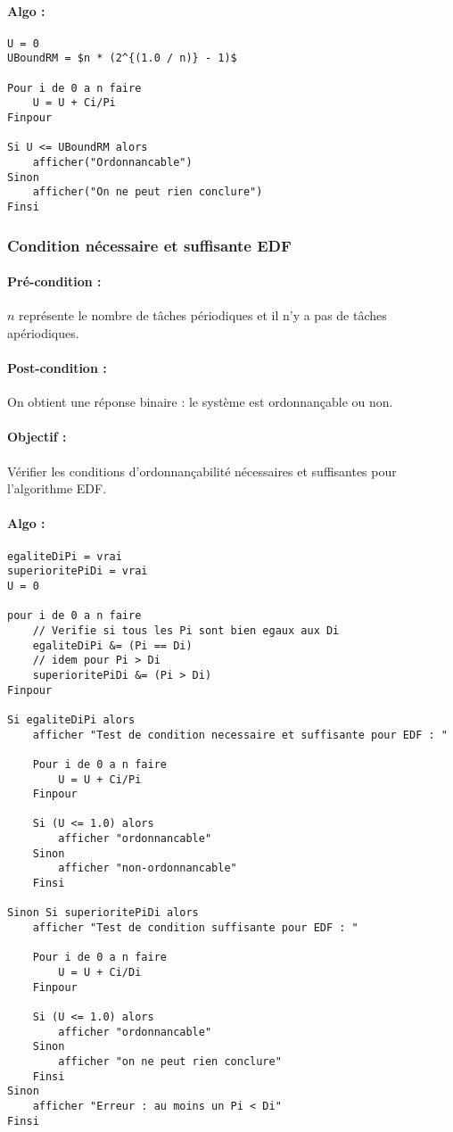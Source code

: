 				\paragraph{Algo :} 
					\begin{lstlisting}[mathescape]
U = 0
UBoundRM = $n * (2^{(1.0 / n)} - 1)$
					
Pour i de 0 a n faire
	U = U + Ci/Pi
Finpour

Si U <= UBoundRM alors
	afficher("Ordonnancable")
Sinon
	afficher("On ne peut rien conclure")
Finsi
					\end{lstlisting}
			
			\subsubsection{Condition nécessaire et suffisante EDF}
				\paragraph{Pré-condition :} $n$ représente le nombre de tâches périodiques et il n'y a pas de tâches apériodiques.
				\paragraph{Post-condition :} On obtient une réponse binaire : le système est ordonnançable ou non.
				\paragraph{Objectif :} Vérifier les conditions d'ordonnançabilité nécessaires et suffisantes pour l'algorithme EDF.
				\paragraph{Algo :} 
					\begin{lstlisting}[mathescape]
egaliteDiPi = vrai					
superioritePiDi = vrai
U = 0		
			
pour i de 0 a n faire
    // Verifie si tous les Pi sont bien egaux aux Di
	egaliteDiPi &= (Pi == Di) 
	// idem pour Pi > Di
	superioritePiDi &= (Pi > Di) 
Finpour

Si egaliteDiPi alors
	afficher "Test de condition necessaire et suffisante pour EDF : "

    Pour i de 0 a n faire
	    U = U + Ci/Pi
    Finpour
	
	Si (U <= 1.0) alors
		afficher "ordonnancable"
	Sinon
		afficher "non-ordonnancable"
	Finsi
	
Sinon Si superioritePiDi alors
	afficher "Test de condition suffisante pour EDF : "
    
    Pour i de 0 a n faire
	    U = U + Ci/Di
    Finpour
	
	Si (U <= 1.0) alors
		afficher "ordonnancable"
	Sinon
		afficher "on ne peut rien conclure"
	Finsi
Sinon
    afficher "Erreur : au moins un Pi < Di"
Finsi
					\end{lstlisting}
					
